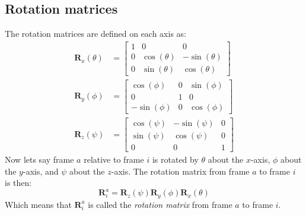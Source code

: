 \subsection{Rotation matrices}
The rotation matrices are defined on each axis as:
\begin{subequations}
    \begin{align}
    \mathbf{R}_x(\theta) &= \begin{bmatrix} 1 & 0 & 0 \\ 0 & \cos(\theta) & -\sin(\theta) \\ 0 & \sin(\theta) & \cos(\theta) \end{bmatrix} \\
    \mathbf{R}_y(\phi) &= \begin{bmatrix} \cos(\phi) & 0 & \sin(\phi) \\ 0 & 1 & 0 \\ -\sin(\phi) & 0 & \cos(\phi) \end{bmatrix} \\
    \mathbf{R}_z(\psi) &= \begin{bmatrix} \cos(\psi) & -\sin(\psi) & 0 \\ \sin(\psi) & \cos(\psi) & 0 \\ 0 & 0 & 1 \end{bmatrix}
    \end{align}
\end{subequations}
Now lets say frame $a$ relative to frame $i$ is rotated by $\theta$ about the $x$-axis, $\phi$ about the $y$-axis, and $\psi$ about the $z$-axis. The rotation matrix from frame $a$ to frame $i$ is then:
\begin{equation}
    \mathbf{R}_i^a = \mathbf{R}_z(\psi)\mathbf{R}_y(\phi)\mathbf{R}_x(\theta)
\end{equation}
Which means that $\mathbf{R}_i^a$ is called the \textit{rotation matrix} from frame $a$ to frame $i$. \newline
